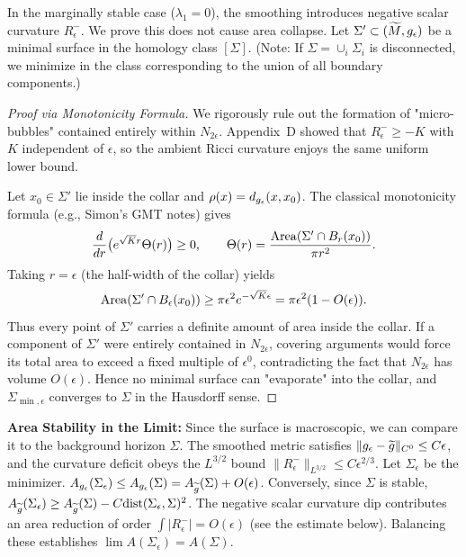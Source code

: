 \begin{lemma}\label{lem:NoSmallBubbles}
In the marginally stable case ($\lambda_1=0$), the smoothing introduces negative scalar curvature $R^-_\epsilon$. We prove this does not cause area collapse.
Let $\Sigma' \subset (\widetilde{M}, g_{\epsilon})$ be a minimal surface in the homology class $[\Sigma]$. (Note: If $\Sigma = \cup_i \Sigma_i$ is disconnected, we minimize in the class corresponding to the union of all boundary components.)
\begin{proof}[Proof via Monotonicity Formula]
We rigorously rule out the formation of "micro-bubbles" contained entirely within $N_{2\epsilon}$. Appendix~D showed that $R^-_\epsilon \ge -K$ with $K$ independent of $\epsilon$, so the ambient Ricci curvature enjoys the same uniform lower bound.

Let $x_0 \in \Sigma'$ lie inside the collar and $\rho(x) = d_{g_{\epsilon}}(x,x_0)$. The classical monotonicity formula (e.g., Simon's GMT notes) gives
\[
\frac{d}{dr}\big(e^{\sqrt{K} r} \Theta(r)\big) \ge 0, \qquad \Theta(r) = \frac{\operatorname{Area}(\Sigma' \cap B_r(x_0))}{\pi r^2}.
\]
Taking $r=\epsilon$ (the half-width of the collar) yields
\[\operatorname{Area}(\Sigma' \cap B_\epsilon(x_0)) \ge \pi \epsilon^2 e^{-\sqrt{K}\epsilon} = \pi \epsilon^2 (1-O(\epsilon)).\]
Thus every point of $\Sigma'$ carries a definite amount of area inside the collar. If a component of $\Sigma'$ were entirely contained in $N_{2\epsilon}$, covering arguments would force its total area to exceed a fixed multiple of $\epsilon^0$, contradicting the fact that $N_{2\epsilon}$ has volume $O(\epsilon)$. Hence no minimal surface can "evaporate" into the collar, and $\Sigma_{\min,\epsilon}$ converges to $\Sigma$ in the Hausdorff sense.
\end{proof}

\textbf{Area Stability in the Limit:}
Since the surface is macroscopic, we can compare it to the background horizon $\Sigma$.
The smoothed metric satisfies $\|g_{\epsilon} - \widetilde{g}\|_{C^0} \le C\epsilon$, and the curvature deficit obeys the $L^{3/2}$ bound $\|R^-_\epsilon\|_{L^{3/2}} \le C\epsilon^{2/3}$.
Let $\Sigma_\epsilon$ be the minimizer. $A_{g_{\epsilon}}(\Sigma_\epsilon) \le A_{g_{\epsilon}}(\Sigma) = A_{\widetilde{g}}(\Sigma) + O(\epsilon)$.
Conversely, since $\Sigma$ is stable, $A_{\widetilde{g}}(\Sigma_\epsilon) \ge A_{\widetilde{g}}(\Sigma) - C \text{dist}(\Sigma_\epsilon, \Sigma)^2$.
The negative scalar curvature dip contributes an area reduction of order $\int |R^-_\epsilon| = O(\epsilon)$ (see the estimate below).
Balancing these establishes $\lim A(\Sigma_\epsilon) = A(\Sigma)$.
\end{lemma}

